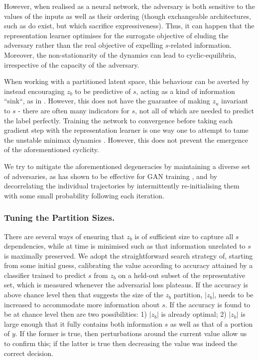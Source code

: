 However, when realised as a neural network, the adversary is both sensitive to the values of the inputs as well as their ordering (though exchangeable architectures, such as \cite{zaheer2017deep} do exist, but which sacrifice expressiveness).
Thus, it can happen that the representation learner optimises for the surrogate objective of eluding the adversary rather than the real objective of expelling $s$-related information.
Moreover, the non-stationarity of the dynamics can lead to cyclic-equilibria, irrespective of the capacity of the adversary.

When working with a partitioned latent space, this behaviour can be averted by instead encouraging $z_b$ to be predictive of $s$, acting as a kind of information ``sink``, as in \cite{JacSmeOya18}.
However, this does not have the guarantee of making $z_u$ invariant to $s$ - there are often many indicators for $s$, not all of which are needed to predict the label perfectly.
Training the network to convergence before taking each gradient step with the representation learner is one way one to attempt to tame the unstable minimax dynamics \cite{feng2019learning}.
However, this does not prevent the emergence of the aforementioned cyclicity.

We try to mitigate the aforementioned degeneracies by maintaining a diverse set of adversaries, as has shown to be effective for GAN training \cite{durugkar2016generative}, and by decorrelating the individual trajectories by intermittently re-initialising them with some small probability following each iteration.

\subsubsection{Tuning the Partition Sizes.}\label{ssec:partition-size-matters}
There are several ways of ensuring that $z_b$ is of sufficient size to capture all $s$ dependencies, while at time is minimised such as that information unrelated to $s$ is maximally preserved. We adopt the straightforward search strategy of, starting from some initial guess, calibrating the value according to accuracy attained by a classifier trained to predict $s$ from $z_b$ on a held-out subset of the representative set, which is measured whenever the adversarial loss plateaus. If the accuracy is above chance level then that suggests the size of the $z_b$ partition, $|z_b|$, needs to be increased to accommodate more information about $s$. If the accuracy is found to be at chance level then are two possibilities: 1) $|z_b|$ is already optimal; 2) $|z_b|$ is large enough that it fully contains both information $s$ as well as that of a portion of $y$. If the former is true, then perturbations around the current value allow us to confirm this; if the latter is true then decreasing the value was indeed the correct decision.


